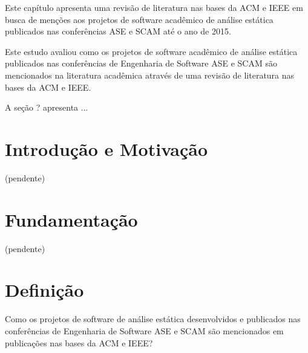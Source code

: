 {Este capítulo apresenta uma revisão de literatura nas bases da ACM e IEEE em
busca de menções aos projetos de software acadêmico de análise estática
publicados nas conferências ASE e SCAM até o ano de 2015.}

Este estudo avaliou como os projetos de software acadêmico de análise estática
publicados nas conferências de Engenharia de Software ASE e SCAM são
mencionados na literatura acadêmica através de uma revisão de literatura nas
bases da ACM e IEEE.

A seção ? apresenta ...

\section{Introdução e Motivação}

(pendente)

\section{Fundamentação} \label{estudo2:fundamentacao} %

(pendente)

%
%
%
%
%
%


\section{Definição} \label{estudo2:definicao} %

Como os projetos de software de análise estática desenvolvidos e publicados nas
conferências de Engenharia de Software ASE e SCAM são mencionados em
publicações nas bases da ACM e IEEE?

